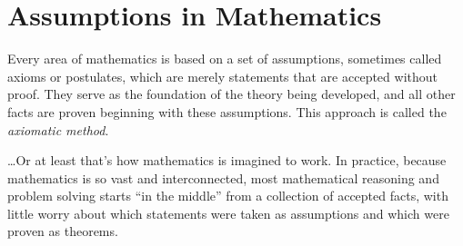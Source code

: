 \begin{problems}
\begin{enumerate}








\end{enumerate}

\end{problems}

\newpage 

\section{Assumptions in Mathematics}
Every area of mathematics is based on a set of assumptions, sometimes called axioms or postulates,
which are merely statements that are accepted without proof.  They serve as the foundation of the theory being developed, and all other facts are proven beginning with these assumptions.  This approach is called the \emph{axiomatic method}.  

\dots Or at least that's how mathematics is imagined to work.  In practice, because mathematics is so vast and interconnected, most mathematical reasoning and problem solving starts ``in the middle'' from a collection of accepted facts, with little worry about which statements were taken as assumptions and which were proven as theorems.  

